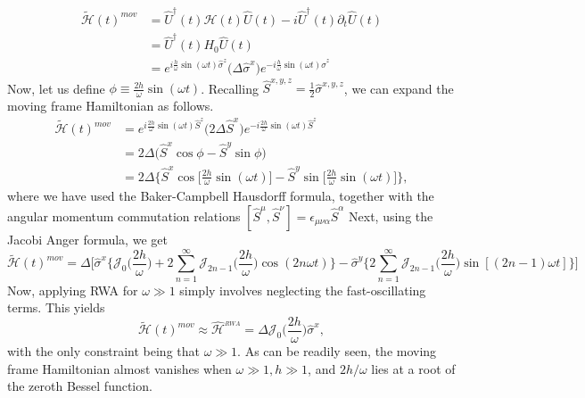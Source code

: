 \documentclass[aps,prb,reprint,showpacs,floatfix,superscriptaddress, onecolumn, nofootinbib, 9pt]{revtex4-2}
\begin{document}
\begin{enumerate}
{\begin{align}
\tilde{\mathcal{H}}(t)^{mov} &=\hat{U}^\dagger(t) \mathcal{H}(t) \hat{U}(t) - i \hat{U}^\dagger(t) \partial_t \hat{U}(t)\nonumber\\
&= \hat{U}^\dagger(t) H_0 \hat{U}(t)\nonumber\\
&= e^{i \frac{h}{\omega} \sin(\omega t)\hat{\sigma}^z} \Big(\Delta \hat{\sigma}^x\Big) e^{-i \frac{h}{\omega} \sin(\omega t)\hat{\sigma}^z}
\end{align}
Now, let us define $\phi \equiv \frac{2h}{\omega} \sin(\omega t)$. Recalling $\hat{S}^{x,y,z} = \frac12 \hat{\sigma}^{x,y,z}$, we can expand the moving frame Hamiltonian as follows.
\begin{align}
\tilde{\mathcal{H}}(t)^{mov} &= e^{i \frac{2h}{\omega} \sin(\omega t)\hat{S}^z} \Big(2\Delta \hat{S}^x\Big) e^{-i \frac{2h}{\omega} \sin(\omega t)\hat{S}^z}\nonumber\\
&= 2\Delta \Big(\hat{S}^x \cos{\phi} - \hat{S}^y \sin{\phi}\Big)\nonumber\\
&= 2\Delta \bigg\{\hat{S}^x\cos\Big[\frac{2h}{\omega}\sin(\omega t)\Big] - \hat{S}^y\sin\Big[\frac{2h}{\omega}\sin(\omega t)\Big]\bigg\},
\end{align}
where we have used the Baker-Campbell Hausdorff formula, together with the angular momentum commutation relations $[\hat{S}^\mu, \hat{S}^\nu]=\epsilon_{\mu\nu\alpha}\hat{S}^\alpha$
Next, using the Jacobi Anger formula, we get
\begin{equation}
\tilde{\mathcal{H}}(t)^{mov} = \Delta \Bigg[\hat{\sigma}^x \bigg\{\mathcal{J}_0\Big(\frac{2h}{\omega}\Big) + 2 \sum_{n=1}^{\infty} \mathcal{J}_{2n-1}\Big(\frac{2h}{\omega}\Big)\cos(2n\omega t)\bigg\} -\hat{\sigma}^y\bigg\{2\sum_{n=1}^{\infty} \mathcal{J}_{2n-1}\Big(\frac{2h}{\omega}\Big) \sin\left[(2n-1)\omega t\right]\bigg\}\Bigg]
\label{eq:hexact}
\end{equation}
Now, applying RWA for $\omega \gg 1$ simply involves neglecting the fast-oscillating terms. This yields
\begin{equation}
\tilde{\mathcal{H}}(t)^{mov}\approx\hat{\mathcal{H}}^{_{RWA}} = \Delta \mathcal{J}_0 \Big(\frac{2h}{\omega}\Big) \hat{\sigma}^x,
\end{equation}
with the only constraint being that $\omega \gg 1$. As can be readily seen, the moving frame Hamiltonian almost vanishes when $\omega\gg 1, h\gg 1$, and $2h/\omega$ lies at a root of the zeroth Bessel function.

}
\end{enumerate}
\end{document}
